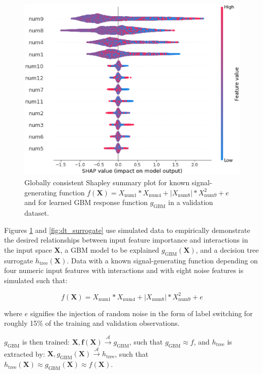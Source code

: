 \documentclass[sigconf, review]{acmart}
\begin{document}
\begin{figure}
	\begin{center}
		\includegraphics[scale=0.4]{img/figure_2.eps}
		\caption{Globally consistent Shapley summary plot for known signal-generating function $f(\mathbf{X}) = X_{\text{num}1} * X_{\text{num}4} + |X_{\text{num}8}| * X_{\text{num}9}^2 + e$ and for learned GBM response function $g_{\text{GBM}}$ in a validation dataset.}
		\label{fig:global_shapley}
	\end{center}
\end{figure}

Figures \ref{fig:global_shapley} and \ref{fig:dt_surrogate} use simulated data to empirically demonstrate the desired relationships between input feature importance and interactions in the input space $\mathbf{X}$, a GBM model to be explained $g_{\text{GBM}}(\mathbf{X})$, and a decision tree surrogate $h_{\text{tree}}(\mathbf{X})$. Data with a known signal-generating function depending on four numeric input features with interactions and with eight noise features is simulated such that: 

\begin{equation}
\label{eq:f}
f(\mathbf{X}) = X_{\text{num}1} * X_{\text{num}4} + |X_{\text{num}8}| * X_{\text{num}9}^2 + e
\end{equation}

\noindent where $e$ signifies the injection of random noise in the form of label switching for roughly 15\% of the training and validation observations. 

$g_{\text{GBM}}$ is then trained: $ \mathbf{X}, \mathbf{f(X)} \xrightarrow{\mathcal{A}} g_{\text{GBM}}$, such that $g_{\text{GBM}} \approx f$, and $h_{\text{tree}}$ is extracted by: $\mathbf{X}, g_{\text{GBM}}(\mathbf{X}) \xrightarrow{\mathcal{A}} h_{\text{tree}}$,  such that\\ $h_{\text{tree}}(\mathbf{X}) \approx g_{\text{GBM}}(\mathbf{X}) \approx f(\mathbf{X})$.
\end{document}
